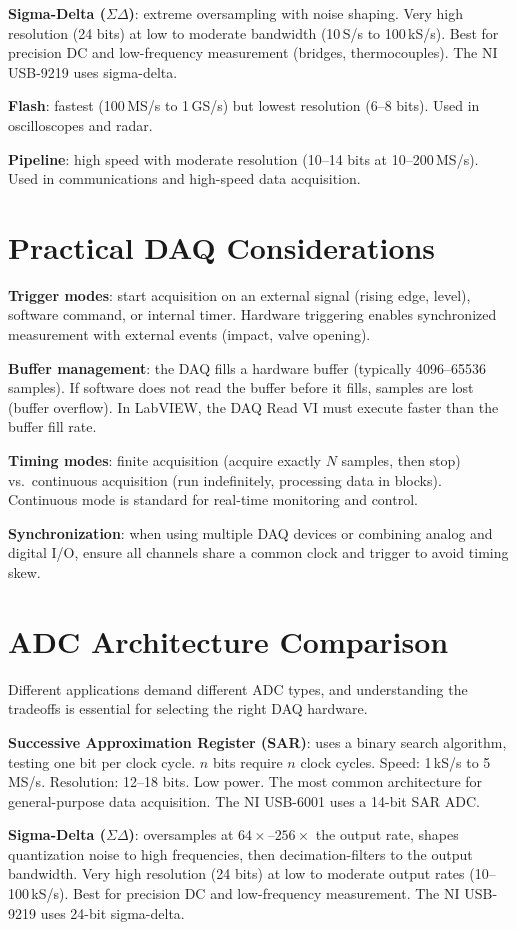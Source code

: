 \documentclass[11pt,letterpaper,twoside,openany]{book}
\begin{document}
\textbf{Sigma-Delta ($\Sigma\Delta$)}: extreme oversampling with noise shaping. Very high resolution (24 bits) at low to moderate bandwidth (10\,S/s to 100\,kS/s). Best for precision DC and low-frequency measurement (bridges, thermocouples). The NI USB-9219 uses sigma-delta.

\textbf{Flash}: fastest (100\,MS/s to 1\,GS/s) but lowest resolution (6--8 bits). Used in oscilloscopes and radar.

\textbf{Pipeline}: high speed with moderate resolution (10--14 bits at 10--200\,MS/s). Used in communications and high-speed data acquisition.

\section{Practical DAQ Considerations}
\textbf{Trigger modes}: start acquisition on an external signal (rising edge, level), software command, or internal timer. Hardware triggering enables synchronized measurement with external events (impact, valve opening).

\textbf{Buffer management}: the DAQ fills a hardware buffer (typically 4096--65536 samples). If software does not read the buffer before it fills, samples are lost (buffer overflow). In LabVIEW, the DAQ Read VI must execute faster than the buffer fill rate.

\textbf{Timing modes}: finite acquisition (acquire exactly $N$ samples, then stop) vs.\ continuous acquisition (run indefinitely, processing data in blocks). Continuous mode is standard for real-time monitoring and control.

\textbf{Synchronization}: when using multiple DAQ devices or combining analog and digital I/O, ensure all channels share a common clock and trigger to avoid timing skew.
\section{ADC Architecture Comparison}
Different applications demand different ADC types, and understanding the tradeoffs is essential for selecting the right DAQ hardware.

\textbf{Successive Approximation Register (SAR)}: uses a binary search algorithm, testing one bit per clock cycle. $n$ bits require $n$ clock cycles. Speed: 1\,kS/s to 5\,MS/s. Resolution: 12--18 bits. Low power. The most common architecture for general-purpose data acquisition. The NI USB-6001 uses a 14-bit SAR ADC.

\textbf{Sigma-Delta ($\Sigma\Delta$)}: oversamples at $64\times$--$256\times$ the output rate, shapes quantization noise to high frequencies, then decimation-filters to the output bandwidth. Very high resolution (24 bits) at low to moderate output rates (10--100\,kS/s). Best for precision DC and low-frequency measurement. The NI USB-9219 uses 24-bit sigma-delta.
\end{document}

